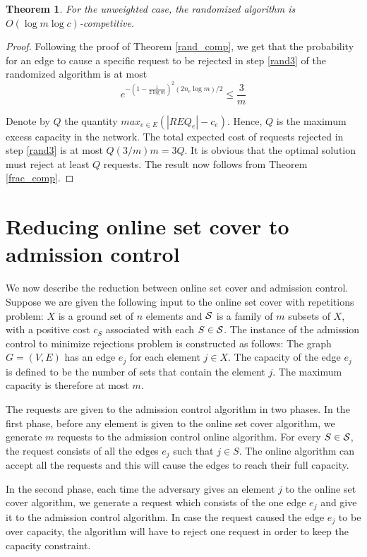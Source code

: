 \documentclass{sig-alternate}
\newtheorem{theorem}{Theorem}\newtheorem{prop}[theorem]{Proposition}
\def \SS   {{\cal S}}
\begin{document}
\begin{theorem}\label{unweighted_rand_comp}
For the unweighted case, the randomized algorithm is $O(\log m
\log c)$-competitive.
\end{theorem}

\begin{proof}
Following the proof of Theorem \ref{rand_comp}, we get that the
probability for an edge to cause a specific request to be rejected
in step \ref{rand3} of the randomized algorithm is at most
$$
e^{-(1-\frac{1}{2 \log m})^2(2 n_e \log m)/2} \leq \frac{3}{m}
$$

Denote by $Q$ the quantity $max_{e \in E} (|REQ_e| - c_e)$. Hence,
$Q$ is the maximum excess capacity in the network. The total
expected cost of requests rejected in step \ref{rand3} is at most
$Q(3/m)m = 3Q$. It is obvious that the optimal solution must
reject at least $Q$ requests. The result now follows from Theorem
\ref{frac_comp}.

\end{proof}

\section{Reducing online set cover to admission control}\label{sec:reduction}
We now describe the reduction between online set cover and
admission control. Suppose we are given the following input to the
online set cover with repetitions problem: $X$ is a ground set of
$n$ elements and $\SS$ is a family of $m$ subsets of $X$, with a
positive cost $c_S$ associated with each $S \in \SS$. The instance
of the admission control to minimize rejections problem is
constructed as follows: The graph $G=(V,E)$ has an edge $e_j$ for
each element $j \in X$. The capacity of the edge $e_j$ is defined
to be the number of sets that contain the element $j$. The maximum
capacity is therefore at most $m$.

The requests are given to the admission control algorithm in two
phases. In the first phase, before any element is given to the
online set cover algorithm, we generate $m$ requests to the
admission control online algorithm. For every $S \in \SS$, the
request consists of all the edges $e_j$ such that $j \in S$. The
online algorithm can accept all the requests and this will cause
the edges to reach their full capacity.

In the second phase, each time the adversary gives an element $j$
to the online set cover algorithm, we generate a request which
consists of the one edge $e_j$ and give it to the admission
control algorithm. In case the request caused the edge $e_j$ to be
over capacity, the algorithm will have to reject one request in
order to keep the capacity constraint.
\end{document}
